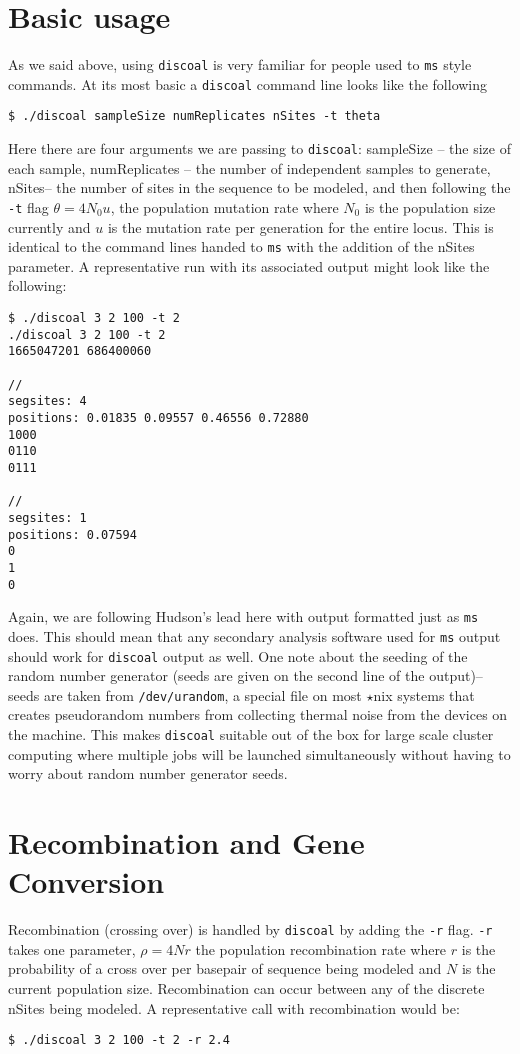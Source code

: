 \documentclass[12pt]{article}
\begin{document}
\section*{Basic usage}
As we said above, using \texttt{discoal} is very familiar for people used to \texttt{ms} style commands. At its
most basic a \texttt{discoal} command line looks like the following
\begin{verbatim}
$ ./discoal sampleSize numReplicates nSites -t theta
\end{verbatim}
Here there are four arguments we are passing to \texttt{discoal}: sampleSize -- the size of each sample, numReplicates -- the
number of independent samples to generate, nSites-- the number of sites in the sequence to be modeled, and then following the \texttt{-t}
flag $\theta = 4N_0u$, the population mutation rate where $N_0$ is the population size currently and $u$ is the mutation rate per generation for the entire locus. This is identical to 
the command lines handed to \texttt{ms} with the addition of the nSites parameter. A representative run with its associated output might look like the following:
\begin{verbatim}
$ ./discoal 3 2 100 -t 2
./discoal 3 2 100 -t 2
1665047201 686400060

//
segsites: 4
positions: 0.01835 0.09557 0.46556 0.72880
1000
0110
0111

//
segsites: 1
positions: 0.07594
0
1
0
\end{verbatim}
Again, we are following Hudson's lead here with output formatted just as \texttt{ms} does. This should mean that any secondary analysis software
used for \texttt{ms} output should work for \texttt{discoal} output as well. One note about the seeding of the random number generator (seeds are given
on the second line of the output)-- seeds are taken from \texttt{/dev/urandom}, a special file on most $\star$nix systems that creates pseudorandom numbers
from collecting thermal noise from the devices on the machine. This makes \texttt{discoal} suitable out of the box for large scale cluster computing 
where multiple jobs will be launched simultaneously without having to worry about random number generator seeds.

\section*{Recombination and Gene Conversion}
Recombination (crossing over) is handled by \texttt{discoal} by adding the \texttt{-r} flag. \texttt{-r} takes one parameter, $\rho=4Nr$ the population recombination rate where $r$ is the probability of a cross over per basepair of sequence being modeled and $N$ is the current population size. Recombination can occur between any of the discrete nSites being modeled. A representative call with recombination would be:
\begin{verbatim}
$ ./discoal 3 2 100 -t 2 -r 2.4
\end{verbatim}
\end{document}
